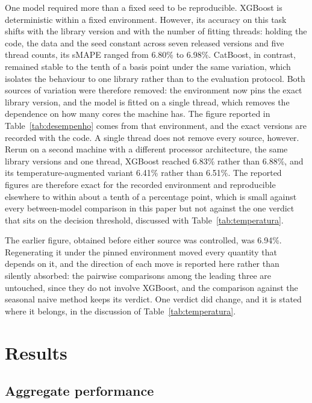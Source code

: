 One model required more than a fixed seed to be reproducible. XGBoost is deterministic
within a fixed environment. However, its accuracy on this task shifts with the library
version and with the number of fitting threads: holding the code, the data and the seed
constant across seven released versions and five thread counts, its sMAPE ranged from
6.80\% to 6.98\%. CatBoost, in contrast, remained stable to the tenth of a basis point under
the same variation, which isolates the behaviour to one library rather than to the
evaluation protocol. Both sources of variation were therefore removed: the environment now
pins the exact library version, and the model is fitted on a single thread, which removes
the dependence on how many cores the machine has.
The figure reported in Table~\ref{tab:desempenho} comes from that environment, and the
exact versions are recorded with the code. A single thread does not remove every source,
however. Rerun on a second machine with a different processor architecture, the same
library versions and one thread, XGBoost reached 6.83\% rather than 6.88\%, and its
temperature-augmented variant 6.41\% rather than 6.51\%. The reported figures are therefore
exact for the recorded environment and reproducible elsewhere to within about a tenth of a
percentage point, which is small against every between-model comparison in this paper but
not against the one verdict that sits on the decision threshold, discussed with
Table~\ref{tab:temperatura}.

The earlier figure, obtained before either source was controlled, was 6.94\%. Regenerating
it under the pinned environment moved every quantity that depends on it, and the direction
of each move is reported here rather than silently absorbed: the pairwise comparisons among
the leading three are untouched, since they do not involve XGBoost, and the comparison
against the seasonal naive method keeps its verdict. One verdict did change, and it is
stated where it belongs, in the discussion of Table~\ref{tab:temperatura}.

\section{Results}

\subsection{Aggregate performance}



